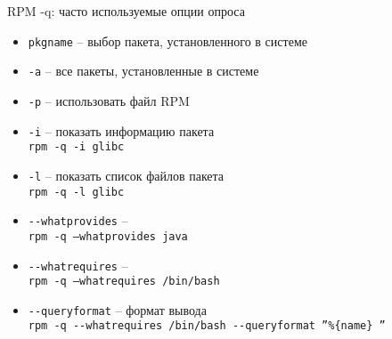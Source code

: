 \begin{frame}{RPM -q: часто используемые опции опроса}

	\begin{itemize}
		\item {\tt pkgname} -- выбор пакета, установленного в системе
		\item {\tt -a} -- все пакеты, установленные в системе
		\item {\tt -p} -- использовать файл RPM
	\end{itemize}


	\begin{itemize}
		\item {\tt -i} -- показать информацию пакета\\
			{\tt rpm \alert{-q} \alert{-i} glibc }
		\item {\tt -l} -- показать список файлов пакета \\
			{\tt rpm \alert{-q -l} glibc }
		\item {\tt -{}-whatprovides} -- \\
			{\tt rpm \alert{-q --whatprovides} java}
		\item {\tt -{}-whatrequires} -- \\
			{\tt rpm \alert{-q --whatrequires} /bin/bash}
		\item {\tt -{}-queryformat} -- формат вывода\\
			{\tt rpm \alert{-q -{}-whatrequires} /bin/bash \alert{-{}-queryformat ''\%\{name\} ''} }

	\end{itemize}

\end{frame}
